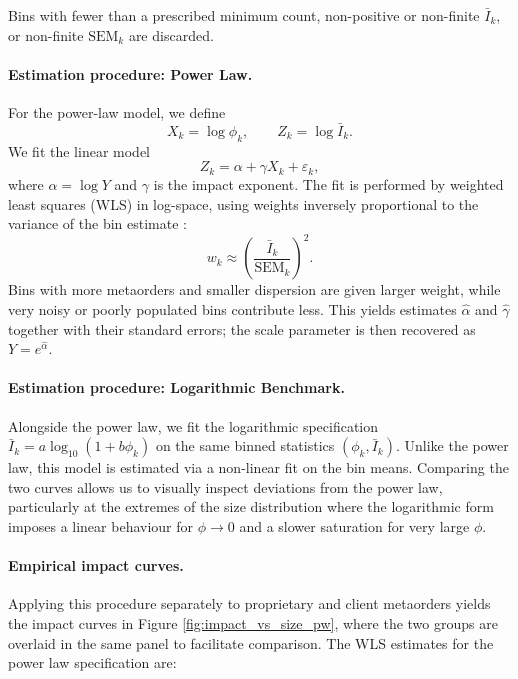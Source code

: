 \documentclass[11pt]{article}
\begin{document}
Bins with fewer than a prescribed minimum count, non-positive or non-finite $\bar{I}_k$, 
or non-finite $\text{SEM}_k$ are discarded.

\paragraph{Estimation procedure: Power Law.}

For the power-law model, we define
\begin{equation}
  X_k = \log \phi_k, \qquad Z_k = \log \bar{I}_k.
\end{equation}
We fit the linear model
\begin{equation}
  Z_k = \alpha + \gamma X_k + \varepsilon_k,
\end{equation}
where $\alpha = \log Y$ and $\gamma$ is the impact exponent. The fit is performed by weighted least squares (WLS) 
in log-space, using weights inversely proportional to the variance of the bin estimate \cite{BouchaudFarmerLillo2008}:
\begin{equation}
    w_k \approx \left(\frac{\bar{I}_k}{\text{SEM}_k}\right)^2.
\end{equation}
Bins with more metaorders and smaller dispersion are given larger weight, while very noisy or poorly populated bins 
contribute less. This yields estimates $\hat{\alpha}$ and $\hat{\gamma}$ together with their standard errors; the 
scale parameter is then recovered as $Y = e^{\hat{\alpha}}$.

\paragraph{Estimation procedure: Logarithmic Benchmark.}

Alongside the power law, we fit the logarithmic specification $\bar{I}_k = a \log_{10}(1+b\phi_k)$ on the same 
binned statistics $(\phi_k, \bar{I}_k)$. Unlike the power law, this model is estimated via a non-linear fit on the 
bin means. Comparing the two curves allows us to visually inspect deviations from the power law, particularly at the 
extremes of the size distribution where the logarithmic form imposes a linear behaviour for $\phi \to 0$ and a slower 
saturation for very large $\phi$.


\paragraph{Empirical impact curves.}

Applying this procedure separately to proprietary and client metaorders yields the impact curves in Figure 
\ref{fig:impact_vs_size_pw}, where the two groups are overlaid in the 
same panel to facilitate comparison. The WLS estimates for the power law specification are:
\end{document}
